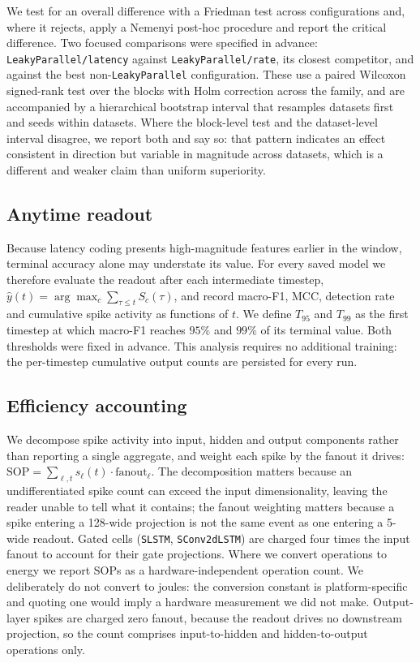 We test for an overall difference with a Friedman test across configurations
and, where it rejects, apply a Nemenyi post-hoc procedure and report the
critical difference. Two focused comparisons were specified in advance:
\texttt{LeakyParallel/latency} against \texttt{LeakyParallel/rate}, its closest
competitor, and against the best non-\texttt{LeakyParallel} configuration. These
use a paired Wilcoxon signed-rank test over the blocks with Holm correction
across the family, and are accompanied by a hierarchical bootstrap interval that
resamples datasets first and seeds within datasets. Where the block-level test
and the dataset-level interval disagree, we report both and say so: that pattern
indicates an effect consistent in direction but variable in magnitude across
datasets, which is a different and weaker claim than uniform superiority.

\subsection{Anytime readout}

Because latency coding presents high-magnitude features earlier in the window,
terminal accuracy alone may understate its value. For every saved model we
therefore evaluate the readout after each intermediate timestep,
$\hat{y}(t)=\arg\max_c\sum_{\tau\le t}S_c(\tau)$, and record macro-F1, MCC,
detection rate and cumulative spike activity as functions of $t$. We define
$T_{95}$ and $T_{99}$ as the first timestep at which macro-F1 reaches $95\%$ and
$99\%$ of its terminal value. Both thresholds were fixed in advance. This
analysis requires no additional training: the per-timestep cumulative output
counts are persisted for every run.

\subsection{Efficiency accounting}
\label{sec:eff}

We decompose spike activity into input, hidden and output components rather than
reporting a single aggregate, and weight each spike by the fanout it drives:
$\mathrm{SOP}=\sum_{\ell,t}s_\ell(t)\cdot\mathrm{fanout}_\ell$. The decomposition
matters because an undifferentiated spike count can exceed the input
dimensionality, leaving the reader unable to tell what it contains; the fanout
weighting matters because a spike entering a 128-wide projection is not the same
event as one entering a 5-wide readout. Gated cells (\texttt{SLSTM},
\texttt{SConv2dLSTM}) are charged four times the input fanout to account for
their gate projections. Where we convert operations to energy we report
SOPs as a hardware-independent operation count. We deliberately do not convert
to joules: the conversion constant is platform-specific and quoting one would
imply a hardware measurement we did not make. Output-layer spikes are charged
zero fanout, because the readout drives no downstream projection, so the count
comprises input-to-hidden and hidden-to-output operations only.

